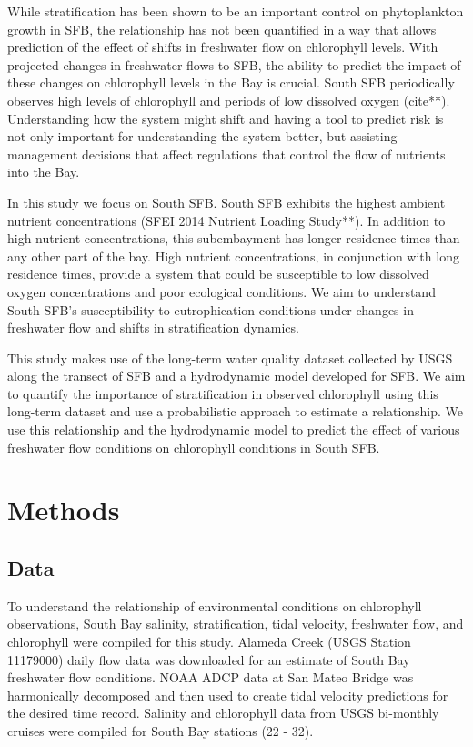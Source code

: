 \documentclass[preprint,review,12pt]{elsarticle}
\begin{document}
While stratification has been shown to be an important control on phytoplankton growth in SFB, the relationship has not been quantified in a way that allows prediction of the effect of shifts in freshwater flow on chlorophyll levels. With projected changes in freshwater flows to SFB, the ability to predict the impact of these changes on chlorophyll levels in the Bay is crucial. South SFB periodically observes high levels of chlorophyll and periods of low dissolved oxygen (cite**). Understanding how the system might shift and having a tool to predict risk is not only important for understanding the system better, but assisting management decisions that affect regulations that control the flow of nutrients into the Bay.  

In this study we focus on South SFB. South SFB exhibits the highest ambient nutrient concentrations (SFEI 2014 Nutrient Loading Study**). In addition to high nutrient concentrations, this subembayment has longer residence times than any other part of the bay. High nutrient concentrations, in conjunction with long residence times, provide a system that could be susceptible to low dissolved oxygen concentrations and poor ecological conditions. We aim to understand South SFB's susceptibility to eutrophication conditions under changes in freshwater flow and shifts in stratification dynamics.

This study makes use of the long-term water quality dataset collected by USGS along the transect of SFB and a hydrodynamic model developed for SFB. We aim to quantify the importance of stratification in observed chlorophyll using this long-term dataset and use a probabilistic approach to estimate a relationship. We use this relationship and the hydrodynamic model to predict the effect of various freshwater flow conditions on chlorophyll conditions in South SFB.  

\section{Methods}\label{S:methods}
\subsection{Data}\label{S:data}
To understand the relationship of environmental conditions on chlorophyll observations, South Bay salinity, stratification, tidal velocity, freshwater flow, and chlorophyll were compiled for this study. Alameda Creek (USGS Station 11179000) daily flow data was downloaded for an estimate of South Bay freshwater flow conditions. NOAA ADCP data at San Mateo Bridge was harmonically decomposed and then used to create tidal velocity predictions for the desired time record. Salinity and chlorophyll data from USGS bi-monthly cruises were compiled for South Bay stations (22 - 32).  
\end{document}
